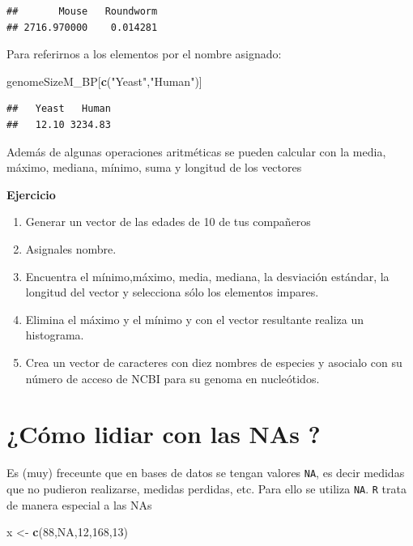 \documentclass[
]{book}
\newenvironment{Shaded}{\begin{snugshade}}{\end{snugshade}}
\newcommand{\ConstantTok}[1]{\textcolor[rgb]{0.56,0.35,0.01}{#1}}
\newcommand{\DecValTok}[1]{\textcolor[rgb]{0.00,0.00,0.81}{#1}}
\newcommand{\FunctionTok}[1]{\textcolor[rgb]{0.13,0.29,0.53}{\textbf{#1}}}
\newcommand{\NormalTok}[1]{#1}
\newcommand{\OtherTok}[1]{\textcolor[rgb]{0.56,0.35,0.01}{#1}}
\newcommand{\StringTok}[1]{\textcolor[rgb]{0.31,0.60,0.02}{#1}}
\providecommand{\tightlist}{%
  \setlength{\itemsep}{0pt}\setlength{\parskip}{0pt}}
\begin{document}
\begin{verbatim}
##       Mouse   Roundworm 
## 2716.970000    0.014281
\end{verbatim}

Para referirnos a los elementos por el nombre asignado:

\begin{Shaded}
\begin{Highlighting}[]
\NormalTok{genomeSizeM\_BP[}\FunctionTok{c}\NormalTok{(}\StringTok{"Yeast"}\NormalTok{,}\StringTok{"Human"}\NormalTok{)]}
\end{Highlighting}
\end{Shaded}

\begin{verbatim}
##   Yeast   Human 
##   12.10 3234.83
\end{verbatim}

Además de algunas operaciones aritméticas se pueden calcular con la media, máximo, mediana, mínimo, suma y longitud de los vectores

\textbf{Ejercicio}

\begin{enumerate}
\def\labelenumi{\arabic{enumi}.}
\tightlist
\item
  Generar un vector de las edades de 10 de tus compañeros
\item
  Asignales nombre.
\item
  Encuentra el mínimo,máximo, media, mediana, la desviación estándar, la longitud del vector y selecciona sólo los elementos impares.
\item
  Elimina el máximo y el mínimo y con el vector resultante realiza un histograma.
\item
  Crea un vector de caracteres con diez nombres de especies y asocialo con su número de acceso de NCBI para su genoma en nucleótidos.
\end{enumerate}

\section{¿Cómo lidiar con las NAs ?}\label{cuxf3mo-lidiar-con-las-nas}

Es (muy) freceunte que en bases de datos se tengan valores \texttt{NA}, es decir medidas que no pudieron realizarse, medidas perdidas, etc. Para ello se utiliza \texttt{NA}.
\texttt{R} trata de manera especial a las NAs

\begin{Shaded}
\begin{Highlighting}[]
\NormalTok{x }\OtherTok{\textless{}{-}} \FunctionTok{c}\NormalTok{(}\DecValTok{88}\NormalTok{,}\ConstantTok{NA}\NormalTok{,}\DecValTok{12}\NormalTok{,}\DecValTok{168}\NormalTok{,}\DecValTok{13}\NormalTok{)}
\end{Highlighting}
\end{Shaded}
\end{document}
